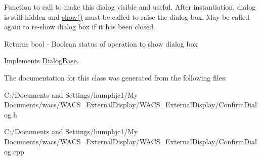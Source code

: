 Function to call to make this dialog visible and useful. After instantiation, dialog is still hidden and \hyperlink{class_confirm_dialog_a143280be0bdd15d67c774aad34e5c436}{show()} must be called to raise the dialog box. May be called again to re-\/show dialog box if it has been closed. 

\begin{DoxyReturn}{Returns}
bool -\/ Boolean status of operation to show dialog box 
\end{DoxyReturn}


Implements \hyperlink{class_dialog_base_af8691afb498d533ac21653fe6bb3aae7}{DialogBase}.



The documentation for this class was generated from the following files:\begin{DoxyCompactItemize}
\item 
C:/Documents and Settings/humphjc1/My Documents/wacs/WACS\_\-ExternalDisplay/WACS\_\-ExternalDisplay/ConfirmDialog.h\item 
C:/Documents and Settings/humphjc1/My Documents/wacs/WACS\_\-ExternalDisplay/WACS\_\-ExternalDisplay/ConfirmDialog.cpp\end{DoxyCompactItemize}
